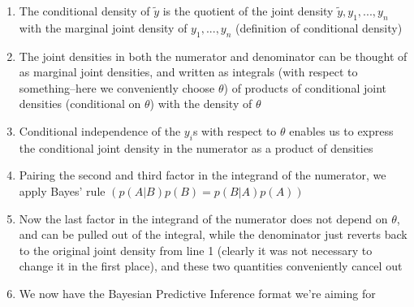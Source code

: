 \documentclass[12pt, a4paper]{article}
\begin{document}
\begin{enumerate}
  \item The conditional density of $\tilde{y}$ is the quotient of the joint density $\tilde{y},y_1,...,y_n$ with the marginal joint density of $y_1,...,y_n$ (definition of conditional density)
  \item The joint densities in both the numerator and denominator can be thought of as marginal joint densities, and written as integrals (with respect to something--here we conveniently choose $\theta$) of products of conditional joint densities (conditional on $\theta$) with the density of $\theta$
  \item Conditional independence of the $y_i$s with respect to $\theta$ enables us to express the conditional joint density in the numerator as a product of densities
  \item Pairing the second and third factor in the integrand of the numerator, we apply Bayes' rule $(p(A|B)p(B) = p(B|A)p(A))$
  \item Now the last factor in the integrand of the numerator does not depend on $\theta$, and can be pulled out of the integral, while the denominator just reverts back to the original joint density from line 1 (clearly it was not necessary to change it in the first place), and these two quantities conveniently cancel out
  \item We now have the Bayesian Predictive Inference format we're aiming for
\end{enumerate}
\end{document}

